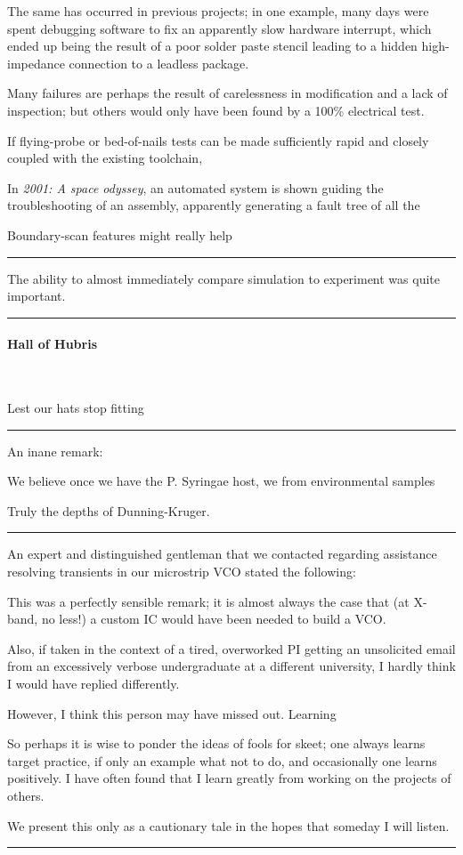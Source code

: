 \documentclass[fleqn,10pt]{article}
\begin{document}
The same has occurred in previous projects; in one example, many days were spent debugging software to fix an apparently slow hardware interrupt, which ended up being the result of a poor solder paste stencil leading to a hidden high-impedance connection to a leadless package.

Many failures are perhaps the result of carelessness in modification and a lack of inspection; but others would only have been found by a 100\% electrical test.

If flying-probe or bed-of-nails tests can be made sufficiently rapid and closely coupled with the existing toolchain, 

In {\it 2001: A space odyssey}, an automated system is shown guiding the troubleshooting of an assembly, apparently generating a fault tree of all the 

Boundary-scan features might really help 

\rule{\linewidth}{0.2pt}

The ability to almost immediately compare simulation to experiment was quite important.

\rule{\linewidth}{0.2pt}


\paragraph{Hall of Hubris} \

Lest our hats stop fitting

\rule{\linewidth}{0.2pt}

An inane remark:

\begin{displayquote}
We believe once we have the P. Syringae host, we from environmental samples
\end{displayquote}

Truly the depths of Dunning-Kruger.

\rule{\linewidth}{0.2pt}

An expert and distinguished gentleman that we contacted regarding assistance resolving transients in our microstrip VCO stated the following:



This was a perfectly sensible remark; it is almost always the case that (at X-band, no less!) a custom IC would have been needed to build a VCO.

Also, if taken in the context of a tired, overworked PI getting an unsolicited email from an excessively verbose undergraduate at a different university, I hardly think I would have replied differently.

However, I think this person may have missed out. Learning 

So perhaps it is wise to ponder the ideas of fools for skeet; one always learns target practice, if only an example what not to do, and occasionally one learns positively. I have often found that I learn greatly from working on the projects of others.

We present this only as a cautionary tale in the hopes that someday I will listen.

\rule{\linewidth}{0.2pt}


\end{document}
